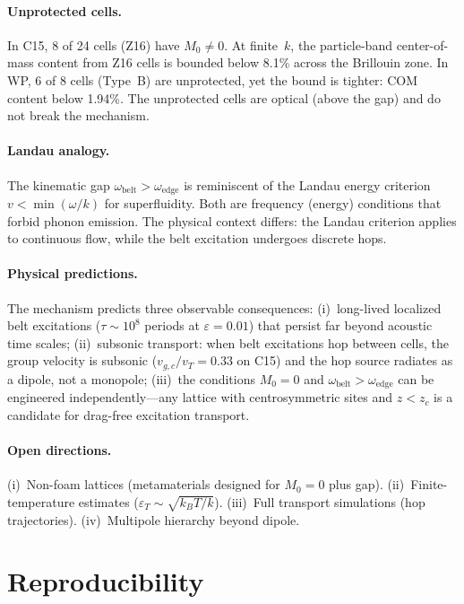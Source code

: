 \documentclass[12pt]{article}
\newcommand{\oedge}{\omega_{\mathrm{edge}}}
\newcommand{\obelt}{\omega_{\mathrm{belt}}}
\begin{document}
\paragraph{Unprotected cells.}
In C15, 8 of 24 cells (Z16) have $M_0 \neq 0$.  At finite~$k$, the
particle-band center-of-mass content from Z16 cells is bounded below
8.1\% across the Brillouin zone.  In WP, 6 of 8 cells (Type~B) are
unprotected, yet the bound is tighter: COM content below 1.94\%.  The
unprotected cells are optical (above the gap) and do not break the
mechanism.

\paragraph{Landau analogy.}
The kinematic gap $\obelt > \oedge$ is reminiscent of the
Landau energy criterion~\cite{Landau1941} $v < \min(\omega/k)$ for
superfluidity.  Both are frequency
(energy) conditions that forbid phonon emission.  The physical context
differs: the Landau criterion applies to continuous flow, while the
belt excitation undergoes discrete hops.

\paragraph{Physical predictions.}
The mechanism predicts three observable consequences:
(i)~long-lived localized belt excitations ($\tau \sim 10^8$ periods at
$\varepsilon = 0.01$) that persist far beyond acoustic time scales;
(ii)~subsonic transport: when belt excitations hop between cells, the
group velocity is subsonic ($v_{g,c}/v_T = 0.33$ on C15) and the hop
source radiates as a dipole, not a monopole;
(iii)~the conditions $M_0 = 0$ and $\obelt > \oedge$ can be
engineered independently---any lattice with centrosymmetric sites and
$z < z_c$ is a candidate for drag-free excitation transport.

\paragraph{Open directions.}
(i)~Non-foam lattices (metamaterials designed for $M_0 = 0$ plus
gap).  (ii)~Finite-temperature estimates ($\varepsilon_T \sim
\sqrt{k_B T / k}$).  (iii)~Full transport simulations (hop
trajectories).  (iv)~Multipole hierarchy beyond dipole.

\section*{Reproducibility}
\end{document}
